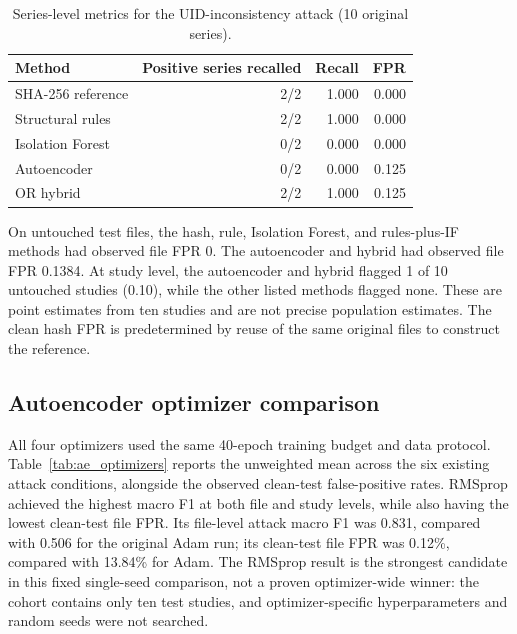 \documentclass[journal]{IEEEtran}
\begin{document}
  \begin{table}[t]
  \caption{Series-level metrics for the UID-inconsistency attack (10 original series).}
  \label{tab:uidseries}
  \centering\footnotesize
  \begin{tabular}{lrrr}
  \toprule
  Method & Positive series recalled & Recall & FPR \\
  \midrule
  SHA-256 reference & 2/2 & 1.000 & 0.000 \\
  Structural rules & 2/2 & 1.000 & 0.000 \\
  Isolation Forest & 0/2 & 0.000 & 0.000 \\
  Autoencoder & 0/2 & 0.000 & 0.125 \\
  OR hybrid & 2/2 & 1.000 & 0.125 \\
  \bottomrule
  \end{tabular}
  \end{table}
  
  On untouched test files, the hash, rule, Isolation Forest, and rules-plus-IF methods had observed file FPR 0. The autoencoder and hybrid had observed file FPR 0.1384. At study level, the autoencoder and hybrid flagged 1 of 10 untouched studies (0.10), while the other listed methods flagged none. These are point estimates from ten studies and are not precise population estimates. The clean hash FPR is predetermined by reuse of the same original files to construct the reference.
  
  \subsection{Autoencoder optimizer comparison}
  All four optimizers used the same 40-epoch training budget and data protocol. Table~\ref{tab:ae_optimizers} reports the unweighted mean across the six existing attack conditions, alongside the observed clean-test false-positive rates. RMSprop achieved the highest macro F1 at both file and study levels, while also having the lowest clean-test file FPR. Its file-level attack macro F1 was 0.831, compared with 0.506 for the original Adam run; its clean-test file FPR was 0.12\%, compared with 13.84\% for Adam. The RMSprop result is the strongest candidate in this fixed single-seed comparison, not a proven optimizer-wide winner: the cohort contains only ten test studies, and optimizer-specific hyperparameters and random seeds were not searched.
  
\end{document}
